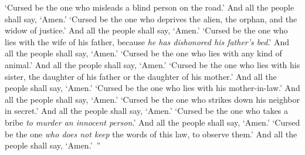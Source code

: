 \begin{biblechapter}
\verse ‘Cursed be the one who misleads a blind person on the road.’ And all the people shall say, ‘Amen.’
\verse ‘Cursed be the one who deprives the alien, the orphan, and the widow of justice.’ And all the people shall say, ‘Amen.’
\verse ‘Cursed be the one who lies with the wife of his father, because \textit{he has dishonored his father’s bed}.’ And all the people shall say, ‘Amen.’
\verse ‘Cursed be the one who lies with any kind of animal.’ And all the people shall say, ‘Amen.’
\verse ‘Cursed be the one who lies with his sister, the daughter of his father or the daughter of his mother.’ And all the people shall say, ‘Amen.’
\verse ‘Cursed be the one who lies with his mother-in-law.’ And all the people shall say, ‘Amen.’
\verse ‘Cursed be the one who strikes down his neighbor in secret.’ And all the people shall say, ‘Amen.’
\verse ‘Cursed be the one who takes a bribe \textit{to murder an innocent person}.’ And all the people shall say, ‘Amen.’
\verse ‘Cursed be the one \textit{who does not keep} the words of this law, to observe them.’ And all the people shall say, ‘Amen.’ ”
\end{biblechapter}

